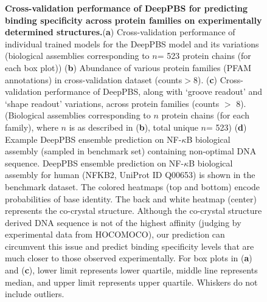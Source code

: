 \begin{center}
\begin{figure} [H]
  \caption[Cross-validation performance of DeepPBS for predicting binding specificity across protein families on experimentally determined structures.]{\textbf{Cross-validation performance of DeepPBS for predicting binding specificity across protein families on experimentally determined structures.}({\bf a}) Cross-validation performance of individual trained models for the DeepPBS model and its variations (biological assemblies corresponding to $n$= 523 protein chains (for each box plot)) ({\bf b}) Abundance of various protein families (PFAM annotations) in cross-validation dataset (counts$>$8). ({\bf c}) Cross-validation performance of DeepPBS, along with ‘groove readout’ and ‘shape readout’ variations, across protein families (counts $>$ 8). (Biological assemblies corresponding to $n$ protein chains (for each family), where $n$ is as described in ({\bf b}), total unique $n$= 523) ({\bf d}) Example DeepPBS ensemble prediction on NF-$\kappa$B biological assembly (sampled in benchmark set) containing non-optimal DNA sequence. DeepPBS ensemble prediction on NF-$\kappa$B biological assembly for human (NFKB2, UniProt ID Q00653) is shown in the benchmark dataset. The colored heatmaps (top and bottom) encode probabilities of base identity. The back and white heatmap (center) represents the co-crystal structure. Although the co-crystal structure derived DNA sequence is not of the highest affinity (judging by experimental data from HOCOMOCO), our prediction can circumvent this issue and predict binding specificity levels that are much closer to those observed experimentally. For box plots in ({\bf a}) and ({\bf c}), lower limit represents lower quartile, middle line represents median, and upper limit represents upper quartile. Whiskers do not include outliers.}
\end{figure}
\end{center}

